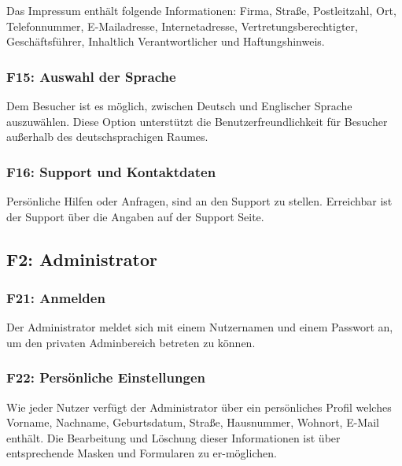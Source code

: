 \documentclass[10pt,a4paper]{scrartcl}
\begin{document}
Das Impressum enthält folgende Informationen: Firma, Straße, Postleitzahl, Ort, Telefonnummer, E-Mailadresse, Internetadresse, Vertretungsberechtigter, \\ Geschäftsführer, Inhaltlich Verantwortlicher und Haftungshinweis.

%

\subsubsection*{F15: Auswahl der Sprache}

Dem Besucher ist es möglich, zwischen Deutsch und Englischer Sprache auszuwählen. Diese Option unterstützt die Benutzerfreundlichkeit für Besucher außerhalb des deutschsprachigen Raumes.

\subsubsection*{F16: Support und Kontaktdaten}

Persönliche Hilfen oder Anfragen, sind an den Support zu stellen. Erreichbar ist der Support \"uber die Angaben auf der Support Seite.


\subsection{F2: Administrator}

\subsubsection*{F21: Anmelden}

Der Administrator meldet sich mit einem Nutzernamen und einem Passwort an, um den privaten Adminbereich betreten zu können.

\subsubsection*{F22: Persönliche Einstellungen}

Wie jeder Nutzer verfügt der Administrator über ein persönliches Profil welches Vorname, Nachname, Geburtsdatum, Straße, Hausnummer, Wohnort, E-Mail enthält. Die Bearbeitung und Löschung dieser Informationen ist über entsprechende Masken und Formularen zu er-möglichen.
\end{document}
